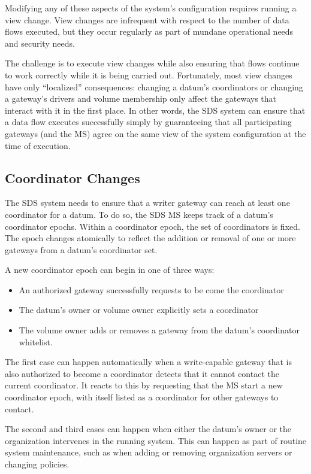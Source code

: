Modifying any of these aspects of the system's configuration requires running a
view change.  View changes are infrequent with respect to the number of data
flows executed, but they occur regularly as part of mundane
operational needs and security needs.

The challenge is to execute view changes while also ensuring that flows
continue to work correctly while it is being carried out.
Fortunately, most view changes have only
``localized'' consequences:  changing a datum's coordinators or changing
a gateway's drivers and volume membership only affect the gateways that interact
with it in the first place.  In other words, the SDS system can ensure that a
data flow executes successfully simply by guaranteeing that all participating
gateways (and the MS) agree on the same view of the system configuration at the
time of execution.

\subsection{Coordinator Changes}

The SDS system needs to ensure that a writer gateway can reach at least one
coordinator for a datum.  To do so, the SDS MS keeps track of a datum's
coordinator epochs.  Within a coordinator epoch, the set of coordinators is
fixed.  The epoch changes atomically to reflect the addition or removal of one
or more gateways from a datum's coordinator set.

A new coordinator epoch can begin in one of
three ways:

\begin{itemize}
   \item An authorized gateway successfully requests to be come the coordinator
   \item The datum's owner or volume owner explicitly sets a coordinator
   \item The volume owner adds or removes a gateway from the datum's coordinator
      whitelist.
\end{itemize}

The first case can happen automatically when a write-capable gateway that is
also authorized to become a coordinator detects that it cannot contact the
current coordinator.  It reacts to this by requesting that the MS start
a new coordinator epoch, with itself listed as a coordinator for other gateways to contact.

The second and third cases can happen when either the datum's owner or the organization
intervenes in the running system.  This can happen as part of routine system
maintenance, such as when adding or removing organization servers or changing
policies.

